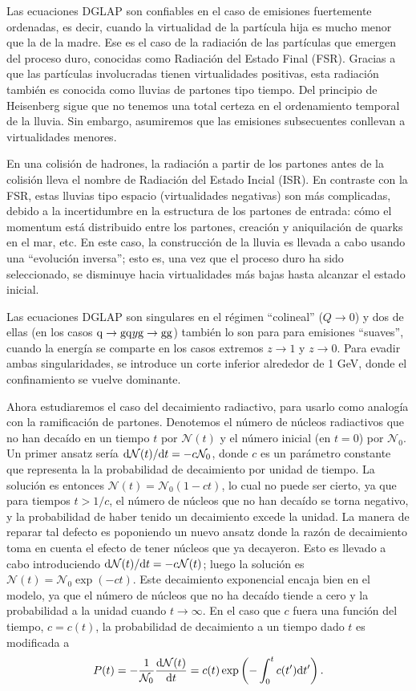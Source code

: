 \documentclass[a4paper,12pt]{article}
\begin{document}
Las ecuaciones DGLAP son confiables en el caso de emisiones fuertemente ordenadas, es decir, cuando la virtualidad de la partícula hija es mucho menor que la de la madre. Ese es el caso de la radiación de las partículas que emergen del proceso duro, conocidas como Radiación del Estado Final (FSR). Gracias a que las partículas involucradas tienen virtualidades positivas, esta radiación también es conocida como lluvias de partones tipo tiempo. Del principio de Heisenberg sigue que no tenemos una total certeza en el ordenamiento temporal de la lluvia. Sin embargo, asumiremos que las emisiones subsecuentes conllevan a virtualidades menores.

En una colisión de hadrones, la radiación a partir de los partones antes de la colisión lleva el nombre de Radiación del Estado Incial (ISR). En contraste con la FSR, estas lluvias tipo espacio (virtualidades negativas) son más complicadas, debido a la incertidumbre en la estructura de los partones de entrada: cómo el momentum está distribuido entre los partones, creación y aniquilación de quarks en el mar, etc. En este caso, la construcción de la lluvia es llevada a cabo usando una ``evolución inversa''; esto es, una vez que el proceso duro ha sido seleccionado, se disminuye hacia virtualidades más bajas hasta alcanzar el estado inicial.

Las ecuaciones DGLAP son singulares en el régimen ``colineal'' ($Q\to0$) y dos de ellas (en los casos ${\mathrm q}\to{\mathrm g}{\mathrm q} y {\mathrm g}\to{\mathrm g}{\mathrm g}$) también lo son para para emisiones ``suaves'', cuando la energía se comparte en los casos extremos $z\to1$ y $z\to0$. Para evadir ambas singularidades, se introduce un corte inferior alrededor de 1 GeV, donde el confinamiento se vuelve dominante.

Ahora estudiaremos el caso del decaimiento radiactivo, para usarlo como analogía con la ramificación de partones. Denotemos el número de núcleos radiactivos que no han decaído en un tiempo $t$ por $\mathcal N(t)$ y el número inicial (en $t=0$) por $\mathcal N_0$. Un primer ansatz sería ${\mathrm d}\mathcal N(t)/{\mathrm d} t = -c \mathcal N_0$, donde $c$ es un parámetro constante que representa la la probabilidad de decaimiento por unidad de tiempo. La solución es entonces $\mathcal N (t) = \mathcal N_0(1-ct)$, lo cual no puede ser cierto, ya que para tiempos $t>1/c$, el número de núcleos que no han decaído se torna negativo, y la probabilidad de haber tenido un decaimiento excede la unidad. La manera de reparar tal defecto es poponiendo un nuevo ansatz donde la razón de decaimiento toma en cuenta el efecto de tener núcleos que ya decayeron. Esto es llevado a cabo introduciendo ${\mathrm d}\mathcal N(t)/{\mathrm d} t = -c \mathcal N(t)$; luego la solución es $\mathcal N(t) = \mathcal N_0 \exp(-ct)$. Este decaimiento exponencial encaja bien en el modelo, ya que el número de núcleos que no ha decaído tiende a cero y la probabilidad a la unidad cuando $t\to \infty$. En el caso que $c$ fuera una función del tiempo, $c=c(t)$, la probabilidad de decaimiento a un tiempo dado $t$ es modificada a
$$P(t)=-\frac{1}{\mathcal N_0} \frac{{\mathrm d}\mathcal N (t)}{{\mathrm d} t} = c(t) \exp\left(-\int_0^t c(t') {\mathrm d} t'\right).$$
\end{document}

